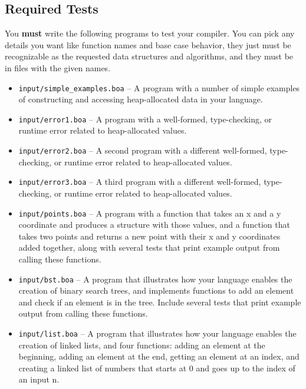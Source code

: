 \documentclass[10pt, oneside]{article}
\begin{document}
\subsection*{Required Tests}

You {\bf must} write the following programs to test your compiler. You can
pick any details you want like function names and base case behavior, they
just must be recognizable as the requested data structures and algorithms,
and they must be in files with the given names.

\begin{itemize}

\item {\tt input/simple\_examples.boa} -- A program with a number of simple
examples of constructing and accessing heap-allocated data in your language.

\item {\tt input/error1.boa} -- A program with a well-formed, type-checking,
or runtime error related to heap-allocated values.

\item {\tt input/error2.boa} -- A second program with a different
well-formed, type-checking, or runtime error related to heap-allocated
values.

\item {\tt input/error3.boa} -- A third program with a different well-formed,
type-checking, or runtime error related to heap-allocated values.

\item {\tt input/points.boa} -- A program with a function that takes an x and
a y coordinate and produces a structure with those values, and a function
that takes two points and returns a new point with their x and y coordinates
added together, along with several tests that print example output from
calling these functions.

\item {\tt input/bst.boa} -- A program that illustrates how your language
enables the creation of binary search trees, and implements functions to add
an element and check if an element is in the tree. Include several tests that
print example output from calling these functions.

\item {\tt input/list.boa} -- A program that illustrates how your language
enables the creation of linked lists, and four functions: adding an element
at the beginning, adding an element at the end, getting an element at an
index, and creating a linked list of numbers that starts at 0 and goes up to
the index of an input n.

\end{itemize}
\end{document}
